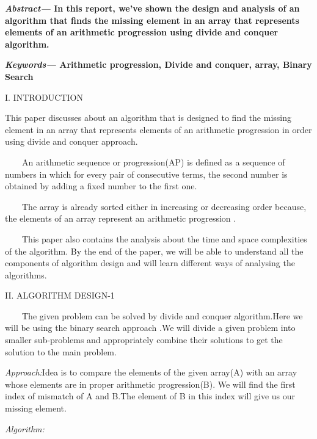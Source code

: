 \documentclass[12pt,a4paper]{article}
\begin{document}
\begin{multicols}{2}
\textbf{\textit{Abstract--- }In this report, we've shown the design and analysis of an algorithm that finds the missing element in an array that represents elements of an arithmetic progression using divide and conquer algorithm.}

\textbf{\textit{Keywords--- } Arithmetic progression, Divide and conquer, array, Binary Search }

\begin{center}I. INTRODUCTION\end{center}

This paper discusses about an algorithm that is  designed to  find the missing element in an array that represents elements of an arithmetic progression in order using divide and conquer approach.

\ \ \ \  An arithmetic sequence or progression(AP) is defined as a sequence of numbers in which for every pair of consecutive terms, the second number is obtained by adding a fixed number to the first one.

\ \ \ \ The array is already sorted either in increasing or decreasing order because, the elements of an array represent an arithmetic progression . 
 
\ \ \ \ This paper also contains the analysis about the time and space complexities of the algorithm. By the end of the paper, we will be able to understand all the components of algorithm design and will learn different ways of analysing the 
algorithms. 



\begin{center}II. ALGORITHM DESIGN-1\end{center}

\ \ \ \ The given problem can be solved by divide and conquer algorithm.Here we will be using the binary search approach .We will divide a given problem into smaller sub-problems and appropriately combine their solutions to get the solution to the main problem.  


\textit{  Approach:}Idea is to compare the elements of the given array(A) with an array whose elements are in proper arithmetic progression(B). We will find the first index of mismatch of A and B.The element of B in this index will give us our missing element.


\textit{  Algorithm:}


\end{multicols}
\end{document}

